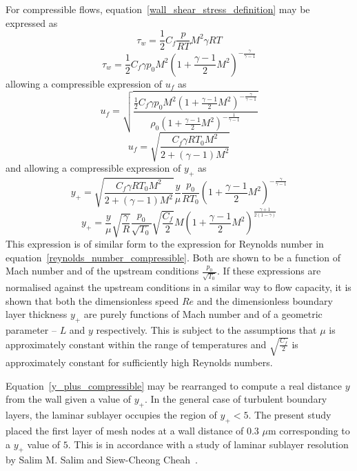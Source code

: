 \documentclass[a4paper, 11pt, oneside]{report}
\begin{document}
For compressible flows, equation~\ref{wall_shear_stress_definition} may be expressed as
\begin{equation}
\tau_w =
\frac{1}{2}
C_f
\frac{p}{RT}
M^2
\gamma
RT
\end{equation}
\begin{equation}
\tau_w =
\frac{1}{2}
C_f
\gamma
p_0
M^2
\left(
	1 +
	\frac{\gamma-1}{2}
	M^2
\right)
^{-\frac{\gamma}{\gamma-1}}
\end{equation}
allowing a compressible expression of $u_f$ as
\begin{equation}
u_f = 
\sqrt{
	\frac{
		\frac{1}{2}
		C_f
		\gamma
		p_0
		M^2
		\left(
			1 +
			\frac{\gamma-1}{2}
			M^2
		\right)
		^{-\frac{\gamma}{\gamma-1}}
	}{
		\rho_0
		\left(
			1 +
			\frac{\gamma-1}{2}
			M^2
		\right)
		^{-\frac{1}{\gamma-1}}
	}
}
\end{equation}
\begin{equation}
u_f = 
\sqrt{
	\frac{
		C_f
		\gamma
		R
		T_0
		M^2
	}{
		2 +
		\left(\gamma-1\right)
		M^2
	}
}
\end{equation}
and allowing a compressible expression of $y_+$ as
\begin{equation}
y_+ = 
\sqrt{
	\frac{
		C_f
		\gamma
		R
		T_0
		M^2
	}{
		2 +
		\left(\gamma-1\right)
		M^2
	}
}
\frac{y}{\mu}
\frac{p_0}{R T_0}
\left(
	1 +
	\frac{\gamma-1}{2}
	M^2
\right)
^{-\frac{\gamma}{\gamma-1}}
\end{equation}
\begin{equation}\label{y_plus_compressible}
y_+ =
\frac{y}{\mu}
\sqrt{\frac{\gamma}{R}}
\frac{p_0}{\sqrt{T_0}}
\sqrt{\frac{C_f}{2}}
M
\left(
	1 +
	\frac{\gamma-1}{2}
	M^2
\right)
^{\frac{\gamma+1}{2(1-\gamma)}}
\end{equation}
This expression is of similar form to the expression for Reynolds number in equation~\ref{reynolds_number_compressible}. Both are shown to be a function of Mach number and of the upstream conditions $\frac{p_0}{\sqrt{T_0}}$. If these expressions are normalised against the upstream conditions in a similar way to flow capacity, it is shown that both the dimensionless speed $Re$ and the dimensionless boundary layer thickness $y_+$ are purely functions of Mach number and of a geometric parameter -- $L$ and $y$ respectively. This is subject to the assumptions that $\mu$ is approximately constant within the range of temperatures and $\sqrt{\frac{C_f}{2}}$ is approximately constant for sufficiently high Reynolds numbers.

Equation~\ref{y_plus_compressible} may be rearranged to compute a real distance $y$ from the wall given a value of $y_+$. In the general case of turbulent boundary layers, the laminar sublayer occupies the region of $y_+ < 5$. The present study placed the first layer of mesh nodes at a wall distance of 0.3 $\mu$m corresponding to a $y_+$ value of $5$. This is in accordance with a study of laminar sublayer resolution by Salim M. Salim and Siew-Cheong Cheah~\cite{salim_y_plus}.
\end{document}
